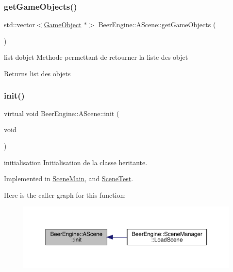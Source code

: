 \subsubsection{\texorpdfstring{get\+Game\+Objects()}{getGameObjects()}}
{\footnotesize\ttfamily std\+::vector$<$\mbox{\hyperlink{class_beer_engine_1_1_game_object}{Game\+Object}} $\ast$$>$ Beer\+Engine\+::\+A\+Scene\+::get\+Game\+Objects (\begin{DoxyParamCaption}{ }\end{DoxyParamCaption})}



list d\textquotesingle{}objet Methode permettant de retourner la liste des objet 

\begin{DoxyReturn}{Returns}
list des objets 
\end{DoxyReturn}
\mbox{\label{class_beer_engine_1_1_a_scene_a7a55b4e506ae618e6596ae812ad48db0}} 
\subsubsection{\texorpdfstring{init()}{init()}}
{\footnotesize\ttfamily virtual void Beer\+Engine\+::\+A\+Scene\+::init (\begin{DoxyParamCaption}\item[{void}]{ }\end{DoxyParamCaption})\hspace{0.3cm}{\ttfamily [pure virtual]}}



initialisation Initialisation de la classe heritante. 



Implemented in \mbox{\hyperlink{class_scene_main_a4406dc5cf9807edcf360ba416de928e2}{Scene\+Main}}, and \mbox{\hyperlink{class_scene_test_aedded03410798c3705fb3fb028e56ab5}{Scene\+Test}}.

Here is the caller graph for this function\+:\nopagebreak
\begin{figure}[H]
\begin{center}
\leavevmode
\includegraphics[width=350pt]{class_beer_engine_1_1_a_scene_a7a55b4e506ae618e6596ae812ad48db0_icgraph}
\end{center}
\end{figure}
\mbox{\label{class_beer_engine_1_1_a_scene_a2bd087ae22796d1e286c867f4f1ecc38}} 
